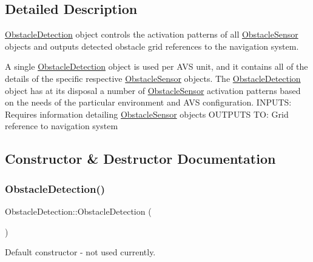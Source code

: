 \subsection{Detailed Description}
\mbox{\hyperlink{class_obstacle_detection}{Obstacle\+Detection}} object controls the activation patterns of all \mbox{\hyperlink{class_obstacle_sensor}{Obstacle\+Sensor}} objects and outputs detected obstacle grid references to the navigation system. 

A single \mbox{\hyperlink{class_obstacle_detection}{Obstacle\+Detection}} object is used per A\+VS unit, and it contains all of the details of the specific respective \mbox{\hyperlink{class_obstacle_sensor}{Obstacle\+Sensor}} objects. The \mbox{\hyperlink{class_obstacle_detection}{Obstacle\+Detection}} object has at its disposal a number of \mbox{\hyperlink{class_obstacle_sensor}{Obstacle\+Sensor}} activation patterns based on the needs of the particular environment and A\+VS configuration. I\+N\+P\+U\+TS\+: Requires information detailing \mbox{\hyperlink{class_obstacle_sensor}{Obstacle\+Sensor}} objects O\+U\+T\+P\+U\+TS TO\+: Grid reference to navigation system 

\subsection{Constructor \& Destructor Documentation}
\mbox{\label{class_obstacle_detection_a1ef460cae951b0ddaa04088645109f47}} 
\subsubsection{\texorpdfstring{Obstacle\+Detection()}{ObstacleDetection()}\hspace{0.1cm}{\footnotesize\ttfamily [1/2]}}
{\footnotesize\ttfamily Obstacle\+Detection\+::\+Obstacle\+Detection (\begin{DoxyParamCaption}{ }\end{DoxyParamCaption})}



Default constructor -\/ not used currently. 

\mbox{\label{class_obstacle_detection_ab70842be18c993b94612f17b653f3674}} 
